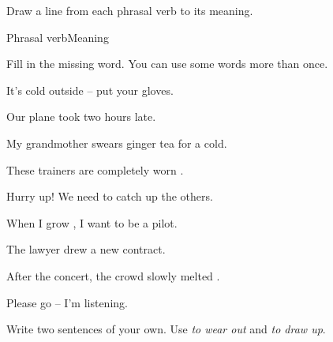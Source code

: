 \documentclass[11pt]{article}
\begin{document}
\clearpage


%
  {Draw a line from each phrasal verb to its meaning.}

\begin{matching}[match-sep=1.35cm]{Phrasal verb}{Meaning}
\end{matching}

%
  {Fill in the missing word. You can use some words more than once.}


\begin{gapexercise}
  \item It's cold outside -- put  your gloves.
  \item Our plane took  two hours late.
  \item My grandmother swears  ginger tea for a cold.
  \item These trainers are completely worn .
  \item Hurry up! We need to catch up  the others.
  \item When I grow , I want to be a pilot.
  \item The lawyer drew  a new contract.
  \item After the concert, the crowd slowly melted .
  \item Please go  -- I'm listening.
\end{gapexercise}

%
  {Write two sentences of your own. Use \textit{to wear out} and \textit{to draw up}.}

\end{document}

